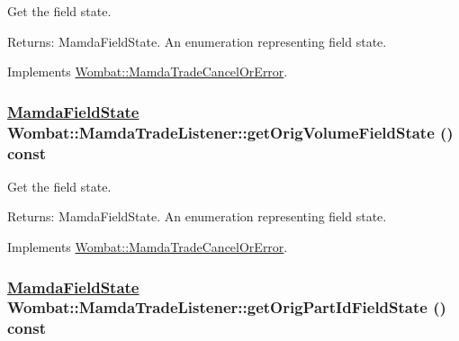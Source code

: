 Get the field state. 

\begin{Desc}
\item[Returns:]Mamda\-Field\-State. An enumeration representing field state. \end{Desc}


Implements \hyperlink{classWombat_1_1MamdaTradeCancelOrError_8de66475d67639ac8bbececda9f73d95}{Wombat::Mamda\-Trade\-Cancel\-Or\-Error}.\hypertarget{classWombat_1_1MamdaTradeListener_359006736d830e51323d578d45f7adc7}{
\subsubsection[getOrigVolumeFieldState]{\setlength{\rightskip}{0pt plus 5cm}\hyperlink{namespaceWombat_93aac974f2ab713554fd12a1fa3b7d2a}{Mamda\-Field\-State} Wombat::Mamda\-Trade\-Listener::get\-Orig\-Volume\-Field\-State () const}}
\label{classWombat_1_1MamdaTradeListener_359006736d830e51323d578d45f7adc7}


Get the field state. 

\begin{Desc}
\item[Returns:]Mamda\-Field\-State. An enumeration representing field state. \end{Desc}


Implements \hyperlink{classWombat_1_1MamdaTradeCancelOrError_c23958d17e2f14b4e29d7e360be35098}{Wombat::Mamda\-Trade\-Cancel\-Or\-Error}.\hypertarget{classWombat_1_1MamdaTradeListener_5e083be5035140d2130f39d19ad79829}{
\subsubsection[getOrigPartIdFieldState]{\setlength{\rightskip}{0pt plus 5cm}\hyperlink{namespaceWombat_93aac974f2ab713554fd12a1fa3b7d2a}{Mamda\-Field\-State} Wombat::Mamda\-Trade\-Listener::get\-Orig\-Part\-Id\-Field\-State () const}}
\label{classWombat_1_1MamdaTradeListener_5e083be5035140d2130f39d19ad79829}


